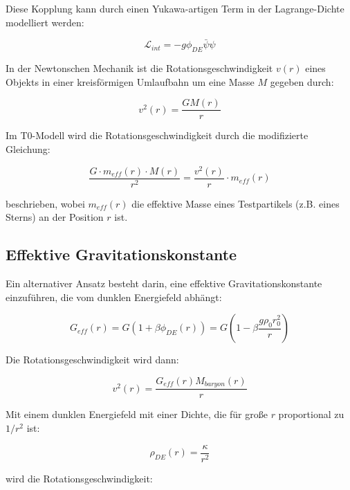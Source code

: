 \documentclass[a4paper,12pt]{article}
\begin{document}
	Diese Kopplung kann durch einen Yukawa-artigen Term in der Lagrange-Dichte modelliert werden:
	
	\begin{equation}
		\mathcal{L}_{int} = -g \phi_{DE} \bar{\psi}\psi
	\end{equation}
	
	In der Newtonschen Mechanik ist die Rotationsgeschwindigkeit $v(r)$ eines Objekts in einer kreisförmigen Umlaufbahn um eine Masse $M$ gegeben durch:
	
	\begin{equation}
		v^2(r) = \frac{GM(r)}{r}
	\end{equation}
	
	Im T0-Modell wird die Rotationsgeschwindigkeit durch die modifizierte Gleichung:
	
	\begin{equation}
		\frac{G \cdot m_{eff}(r) \cdot M(r)}{r^2} = \frac{v^2(r)}{r} \cdot m_{eff}(r)
	\end{equation}
	
	beschrieben, wobei $m_{eff}(r)$ die effektive Masse eines Testpartikels (z.B. eines Sterns) an der Position $r$ ist.
	
	\subsection{Effektive Gravitationskonstante}
	
	Ein alternativer Ansatz besteht darin, eine effektive Gravitationskonstante einzuführen, die vom dunklen Energiefeld abhängt:
	
	\begin{equation}
		G_{eff}(r) = G\left(1 + \beta\phi_{DE}(r)\right) = G\left(1 - \beta\frac{g\rho_0 r_0^2}{r}\right)
	\end{equation}
	
	Die Rotationsgeschwindigkeit wird dann:
	
	\begin{equation}
		v^2(r) = \frac{G_{eff}(r)M_{baryon}(r)}{r}
	\end{equation}
	
	Mit einem dunklen Energiefeld mit einer Dichte, die für große $r$ proportional zu $1/r^2$ ist:
	
	\begin{equation}
		\rho_{DE}(r) = \frac{\kappa}{r^2}
	\end{equation}
	
	wird die Rotationsgeschwindigkeit:
	
\end{document}
